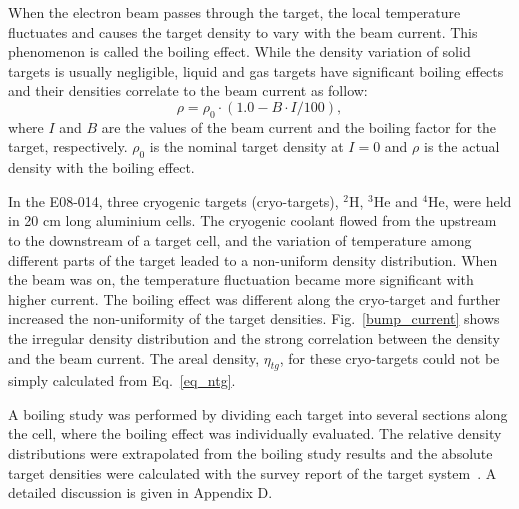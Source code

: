  When the electron beam passes through the target, the local temperature fluctuates and causes the target density to vary with the beam current. This phenomenon is called the boiling effect. While the density variation of solid targets is usually negligible, liquid and gas targets have significant boiling effects and their densities correlate to the beam current as follow:
\begin{equation}
  \rho = \rho_{0} \cdot (1.0 - B \cdot I /100),
  \label{eq_tgrho}
\end{equation}
where $I$ and $B$ are the values of the beam current and the boiling factor for the target, respectively. $\rho_{0}$ is the nominal target density at $I=0$ and $\rho$ is the actual density with the boiling effect.

 In the E08-014, three cryogenic targets (cryo-targets), $\mathrm{^{2}H}$, $\mathrm{^{3}He}$ and $\mathrm{^{4}He}$, were held in 20 cm long aluminium cells. The cryogenic coolant flowed from the upstream to the downstream of a target cell, and the variation of temperature among different parts of the target leaded to a non-uniform density distribution. When the beam was on, the temperature fluctuation became more significant with higher current. The boiling effect was different along the cryo-target and further increased the non-uniformity of the target densities. Fig.~\ref{bump_current} shows the irregular density distribution and the strong correlation between the density and the beam current. The areal density, $\eta_{tg}$, for these cryo-targets could not be simply calculated from Eq.~\eqref{eq_ntg}.

  A boiling study was performed by dividing each target into several sections along the cell, where the boiling effect was individually evaluated. The relative density distributions were extrapolated from the boiling study results and the absolute target densities were calculated with the survey report of the target system~\cite{target_report}. A detailed discussion is given in Appendix D. 
 
